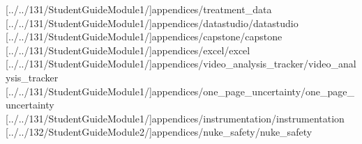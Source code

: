 \documentclass[english,twoside]{labmanual} %
\begin{document}
\appendix
{} %
\cleardoublepage
\NoForceSectionOddPage %
\renewcommand{\headersupplementmark}{Appendix }
\titleformat{\section}{\normalfont\large\bfseries}{\headersupplementmark \thesection :}{1ex}{}

[../../131/StudentGuideModule1/]{appendices/treatment_data}
[../../131/StudentGuideModule1/]{appendices/datastudio/datastudio}
[../../131/StudentGuideModule1/]{appendices/capstone/capstone}
[../../131/StudentGuideModule1/]{appendices/excel/excel}
[../../131/StudentGuideModule1/]{appendices/video_analysis_tracker/video_analysis_tracker}
[../../131/StudentGuideModule1/]{appendices/one_page_uncertainty/one_page_uncertainty}
[../../131/StudentGuideModule1/]{appendices/instrumentation/instrumentation}
[../../132/StudentGuideModule2/]{appendices/nuke_safety/nuke_safety}
\end{document}
